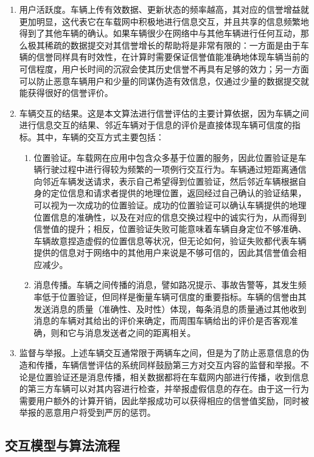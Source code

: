 \begin{enumerate}
    \item 用户活跃度。车辆上传有效数据、更新状态的频率越高，其对应的信誉增益就更加明显，这代表它在车载网中积极地进行信息交互，并且共享的信息频繁地得到了其他车辆的确认。如果车辆很少在网络中与其他车辆进行任何互动，那么极其稀疏的数据提交对其信誉增长的帮助将是非常有限的：一方面是由于车辆的信誉同样具有时效性，在计算时需要保证信誉值能准确地体现车辆当前的可信程度，用户长时间的沉寂会使其历史信誉不再具有足够的效力；另一方面可以防止恶意车辆用户和少量的同谋伪造有效信息，仅通过少量的数据提交就能获得很好的信誉评价。
    \item 车辆交互的结果。这是本文算法进行信誉评估的主要计算依据，因为车辆之间进行信息交互的结果、邻近车辆对于信息的评价是直接体现车辆可信度的指标。其中，车辆的交互方式主要包括：
    \begin{enumerate}
        \item 位置验证。车载网在应用中包含众多基于位置的服务，因此位置验证是车辆行驶过程中进行得较为频繁的一项例行交互行为。车辆通过短距离通信向邻近车辆发送请求，表示自己希望得到位置验证，然后邻近车辆根据自身的定位信息和请求者提供的地理位置，返回经过自己确认的验证结果，可以视为一次成功的位置验证。成功的位置验证可以确认车辆提供的地理位置信息的准确性，以及在对应的信息交换过程中的诚实行为，从而得到信誉值的提升；相反，位置验证失败可能意味着车辆自身定位不够准确、车辆故意捏造虚假的位置信息等状况，但无论如何，验证失败都代表车辆提供的信息对于网络中的其他用户来说是不够可信的，因此其信誉值会相应减少。
        \item 消息传播。车辆之间传播的消息，譬如路况提示、事故告警等，其发生频率低于位置验证，但同样是衡量车辆可信度的重要指标。车辆的信誉由其发送消息的质量（准确性、及时性）体现，每条消息的质量通过其他收到消息的车辆对其给出的评价来确定，而周围车辆给出的评价是否客观准确，则和它与消息发送者之间的距离相关。
    \end{enumerate}
    \item 监督与举报。上述车辆交互通常限于两辆车之间，但是为了防止恶意信息的伪造和传播，车辆信誉评估的系统同样鼓励第三方对交互内容的监督和举报。不论是位置验证还是消息传播，相关数据都将在车载网内部进行传播，收到信息的第三方车辆可以对其内容进行检查，并举报虚假信息的存在。由于这一行为需要用户额外的计算开销，因此举报成功可以获得相应的信誉值奖励，同时被举报的恶意用户将受到严厉的惩罚。
\end{enumerate}

\subsection{交互模型与算法流程}

